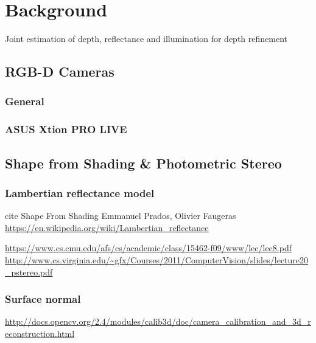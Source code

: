 \chapter{Background} \label{chap:background}
Joint estimation of depth, reflectance and illumination for depth refinement

\section{RGB-D Cameras}

\subsection{General}

\subsection{ASUS Xtion PRO LIVE}


\section{Shape from Shading \& Photometric Stereo}
\subsection{Lambertian reflectance model}

cite Shape From Shading Emmanuel Prados, Olivier Faugeras
\url{https://en.wikipedia.org/wiki/Lambertian_reflectance}

\url{https://www.cs.cmu.edu/afs/cs/academic/class/15462-f09/www/lec/lec8.pdf}
\url{http://www.cs.virginia.edu/~gfx/Courses/2011/ComputerVision/slides/lecture20_pstereo.pdf}

\subsection{Surface normal}
\url{http://docs.opencv.org/2.4/modules/calib3d/doc/camera_calibration_and_3d_reconstruction.html}


